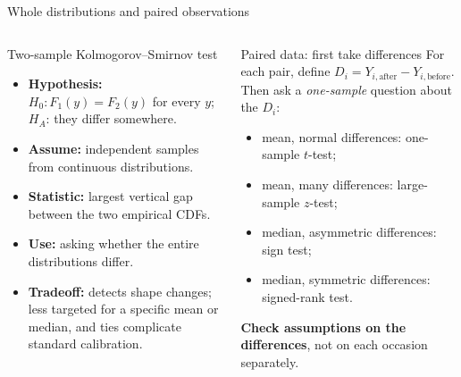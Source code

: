 \documentclass[aspectratio=169,11pt]{beamer}
\begin{document}
\begin{frame}{Whole distributions and paired observations}
  \footnotesize
  \begin{columns}[T,onlytextwidth]
      \begin{block}{Two-sample Kolmogorov--Smirnov test}
        \begin{itemize}
          \item \textbf{Hypothesis:} \(H_0:F_1(y)=F_2(y)\) for every \(y\); \(H_A\): they differ somewhere.
          \item \textbf{Assume:} independent samples from continuous distributions.
          \item \textbf{Statistic:} largest vertical gap between the two empirical CDFs.
          \item \textbf{Use:} asking whether the entire distributions differ.
          \item \textbf{Tradeoff:} detects shape changes; less targeted for a specific mean or median, and ties complicate standard calibration.
        \end{itemize}
      \end{block}
      \begin{exampleblock}{Paired data: first take differences}
        For each pair, define \(D_i=Y_{i,\mathrm{after}}-Y_{i,\mathrm{before}}\).
        Then ask a \emph{one-sample} question about the \(D_i\):
        \begin{itemize}
          \item mean, normal differences: one-sample \(t\)-test;
          \item mean, many differences: large-sample \(z\)-test;
          \item median, asymmetric differences: sign test;
          \item median, symmetric differences: signed-rank test.
        \end{itemize}

        \textbf{Check assumptions on the differences}, not on each occasion separately.
      \end{exampleblock}
  \end{columns}
\end{frame}
\end{document}
